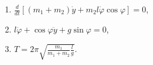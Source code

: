 \begin{enumerate}
	\item $\frac{d}{dt}[(m_1 + m_2)\dot{y} +
	m_2l\dot{\varphi}\cos{\varphi}] = 0$,
	\item $l\ddot{\varphi} + \cos{\varphi\ddot{y}} + g\sin{\varphi} = 0$,
	\item $T = 2\pi\sqrt{\frac{m_1}{m_1 + m_2}\frac{l}{g}}$.
\end{enumerate}
